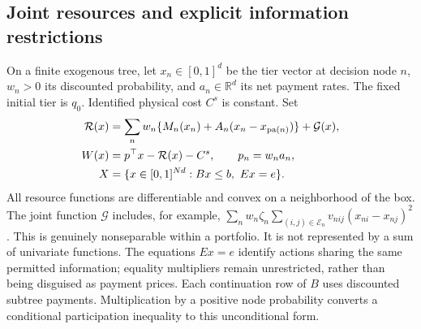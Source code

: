 \documentclass[11pt,letterpaper]{article}
\theoremstyle{definition}
\newcommand{\R}{\mathbb R}
\newcommand{\1}{\mathbf 1}
\begin{document}
\subsection{Joint resources and explicit information restrictions}
On a finite exogenous tree, let $x_n\in[0,1]^d$ be the tier vector at decision node $n$, $w_n>0$ its discounted probability, and $a_n\in\R^d$ its net payment rates. The fixed initial tier is $q_0$. Identified physical cost $C^s$ is constant. Set
\begin{align}
 \mathcal R(x)&=\sum_n w_n\{M_n(x_n)+A_n(x_n-x_{\mathrm{pa}(n)})\}+\mathcal G(x),\label{eq:r10-resource}\\
 W(x)&=p^\top x-\mathcal R(x)-C^s,\qquad p_n=w_na_n,\notag\\
 X&=\{x\in[0,1]^{Nd}: Bx\leq b,\ Ex=e\}.\label{eq:r10-poly}
\end{align}
All resource functions are differentiable and convex on a neighborhood of the box. The joint function $\mathcal G$ includes, for example, $\sum_n w_n\zeta_n\sum_{(i,j)\in\mathcal E_n}v_{nij}(x_{ni}-x_{nj})^2$. This is genuinely nonseparable within a portfolio. It is not represented by a sum of univariate functions. The equations $Ex=e$ identify actions sharing the same permitted information; equality multipliers remain unrestricted, rather than being disguised as payment prices. Each continuation row of $B$ uses discounted subtree payments. Multiplication by a positive node probability converts a conditional participation inequality to this unconditional form.
\end{document}
